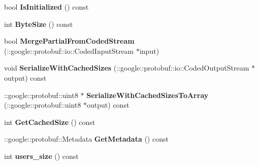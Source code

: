 \begin{DoxyCompactItemize}
\item 
\hypertarget{classSimpleChat_1_1UserListResponse_a062c71b80549b7ec68d7d53c7a4c4b26}{bool {\bfseries Is\-Initialized} () const }\label{classSimpleChat_1_1UserListResponse_a062c71b80549b7ec68d7d53c7a4c4b26}

\item 
\hypertarget{classSimpleChat_1_1UserListResponse_af8d8db17515cc8a05428636db1667f33}{int {\bfseries Byte\-Size} () const }\label{classSimpleChat_1_1UserListResponse_af8d8db17515cc8a05428636db1667f33}

\item 
\hypertarget{classSimpleChat_1_1UserListResponse_a070121c5d035b79d64ef1c1d4478a667}{bool {\bfseries Merge\-Partial\-From\-Coded\-Stream} (\-::google\-::protobuf\-::io\-::\-Coded\-Input\-Stream $\ast$input)}\label{classSimpleChat_1_1UserListResponse_a070121c5d035b79d64ef1c1d4478a667}

\item 
\hypertarget{classSimpleChat_1_1UserListResponse_ad482db6ecf83a8774585d6c61d3c26ab}{void {\bfseries Serialize\-With\-Cached\-Sizes} (\-::google\-::protobuf\-::io\-::\-Coded\-Output\-Stream $\ast$output) const }\label{classSimpleChat_1_1UserListResponse_ad482db6ecf83a8774585d6c61d3c26ab}

\item 
\hypertarget{classSimpleChat_1_1UserListResponse_a9b075ee40113e581b5cc7bddfbb392b3}{\-::google\-::protobuf\-::uint8 $\ast$ {\bfseries Serialize\-With\-Cached\-Sizes\-To\-Array} (\-::google\-::protobuf\-::uint8 $\ast$output) const }\label{classSimpleChat_1_1UserListResponse_a9b075ee40113e581b5cc7bddfbb392b3}

\item 
\hypertarget{classSimpleChat_1_1UserListResponse_a9ffec135df81b1161c04402e083e67c2}{int {\bfseries Get\-Cached\-Size} () const }\label{classSimpleChat_1_1UserListResponse_a9ffec135df81b1161c04402e083e67c2}

\item 
\hypertarget{classSimpleChat_1_1UserListResponse_ac52be5912c5abdf036f561b110653a0d}{\-::google\-::protobuf\-::\-Metadata {\bfseries Get\-Metadata} () const }\label{classSimpleChat_1_1UserListResponse_ac52be5912c5abdf036f561b110653a0d}

\item 
\hypertarget{classSimpleChat_1_1UserListResponse_a160638ddfd252c614f2d198a77de1432}{int {\bfseries users\-\_\-size} () const }\label{classSimpleChat_1_1UserListResponse_a160638ddfd252c614f2d198a77de1432}


\end{DoxyCompactItemize}
